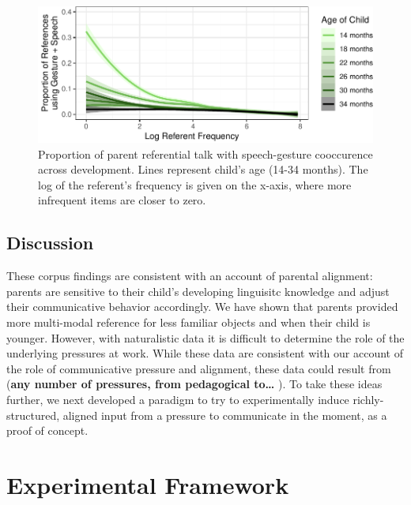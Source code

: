 \documentclass[10pt, letterpaper]{article}
\newenvironment{CodeChunk}{}{}
\begin{document}
\begin{CodeChunk}
\begin{figure}[h]

{\centering \includegraphics{figs/corpus_plot-1} 

}

\caption[Proportion of parent referential talk with speech-gesture cooccurence across development]{Proportion of parent referential talk with speech-gesture cooccurence across development. Lines represent child's age (14-34 months). The log of the referent's frequency is given on the x-axis, where more infrequent items are closer to zero.}\label{fig:corpus_plot}
\end{figure}
\end{CodeChunk}

\subsection{Discussion}\label{discussion}

These corpus findings are consistent with an account of parental
alignment: parents are sensitive to their child's developing linguisitc
knowledge and adjust their communicative behavior accordingly. We have
shown that parents provided more multi-modal reference for less familiar
objects and when their child is younger. However, with naturalistic data
it is difficult to determine the role of the underlying pressures at
work. While these data are consistent with our account of the role of
communicative pressure and alignment, these data could result from
(\textbf{any number of pressures, from pedagogical to\ldots{} }). To
take these ideas further, we next developed a paradigm to try to
experimentally induce richly-structured, aligned input from a pressure
to communicate in the moment, as a proof of concept.

\section{Experimental Framework}\label{experimental-framework}
\end{document}
